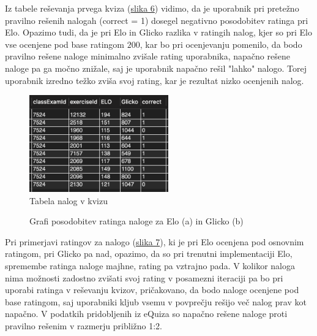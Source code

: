 \documentclass{IEEEtran}
\begin{document}
Iz tabele reševanja prvega kviza (\hyperref[fig:tabela]{slika 6}) vidimo, da je uporabnik pri pretežno pravilno rešenih nalogah (correct = 1)
dosegel negativno posodobitev ratinga pri Elo. Opazimo tudi, da je pri Elo in Glicko razlika v ratingih nalog,
kjer so pri Elo vse ocenjene pod base ratingom $200$, kar bo pri ocenjevanju pomenilo, da bodo pravilno rešene naloge
minimalno zvišale rating uporabnika, napačno rešene naloge pa ga močno znižale, saj je uporabnik napačno rešil "lahko"
nalogo. Torej uporabnik izredno težko zviša svoj rating, kar je rezultat nizko ocenjenih nalog.

\begin{figure}[h!]
    \centering
    \includegraphics[width=6cm]{ExamExample}
    \caption{Tabela nalog v kvizu}%
    \label{fig:tabela}%
\end{figure}

\newpage

\begin{figure}%
    \caption{Grafi posodobitev ratinga naloge za Elo (a) in Glicko (b)}%
    \label{fig:elovsglickoe}%
\end{figure}

Pri primerjavi ratingov za nalogo (\hyperref[fig:elovsglickoe]{slika 7}), ki je pri Elo ocenjena pod osnovnim ratingom, pri Glicko pa nad, opazimo, da so pri trenutni implementaciji Elo, spremembe ratinga naloge majhne, rating pa vztrajno pada. V kolikor naloga nima možnosti
zadostno zvišati svoj rating v posamezni iteraciji pa bo pri uporabi ratinga v reševanju kvizov, pričakovano, da
bodo naloge ocenjene pod base ratingom, saj uporabniki kljub vsemu v povprečju rešijo več nalog prav kot napačno.
V podatkih pridobljenih iz eQuiza so napačno rešene naloge proti pravilno rešenim v razmerju približno 1:2.
\hfill
\\
\end{document}
